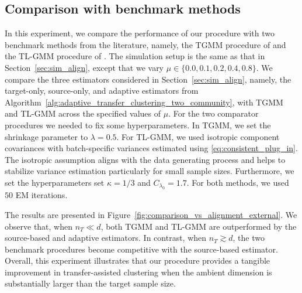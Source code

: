 \documentclass[10pt]{article}
\newcommand{\trg}{T}
\newcommand{\nT}{n_{\trg}}
\begin{document}
\subsection{Comparison with benchmark methods}
\label{sec:comparator_benchmarks}

In this experiment, we compare the performance of our procedure with two benchmark methods from the literature, namely, the TGMM procedure of \cite[Algorithm~1]{wang_zhou} and the TL-GMM procedure of \cite[Algorithm~7]{tian2025robust}. The simulation setup is the same as that in Section~\ref{sec:sim_align}, except that we vary $\mu\in\{0.0,0.1,0.2,0.4,0.8\}$. We compare the three estimators considered in Section~\ref{sec:sim_align}, namely, the target-only, source-only, and adaptive estimators from Algorithm~\ref{alg:adaptive_transfer_clustering_two_community}, with TGMM and TL-GMM across the specified values of $\mu$. For the two comparator procedures we needed to fix some hyperparameters. In TGMM, we set the shrinkage parameter to $\lambda=0.5$. For TL-GMM, we used isotropic component covariances with batch-specific variances estimated using \eqref{eq:consistent_plug_in}. The isotropic assumption aligns with the data generating process and helps to stabilize variance estimation particularly for small sample sizes. Furthermore, we set the hyperparameters set $\kappa=1/3$ and $C_{\lambda_0}=1.7$. For both methods, we used $50$ EM iterations.

The results are presented in Figure~\ref{fig:comparison_vs_alignment_external}. We observe that, when $\nT\ll d$, both TGMM and TL-GMM are outperformed by the source-based and adaptive estimators. In contrast, when $\nT\gtrsim d$, the two benchmark procedures become competitive with the source-based estimator. Overall, this experiment illustrates that our procedure provides a tangible improvement in transfer-assisted clustering when the ambient dimension is substantially larger than the target sample size.
\end{document}
